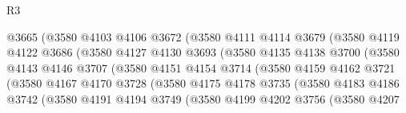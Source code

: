 \begin{lexlean}{R3}
\begin{coremodule}
                            @3665
                            (@3580
                              @4103
                              @4106
                              @3672
                              (@3580
                                @4111
                                @4114
                                @3679
                                (@3580
                                  @4119
                                  @4122
                                  @3686
                                  (@3580
                                    @4127
                                    @4130
                                    @3693
                                    (@3580
                                      @4135
                                      @4138
                                      @3700
                                      (@3580
                                        @4143
                                        @4146
                                        @3707
                                        (@3580
                                          @4151
                                          @4154
                                          @3714
                                          (@3580
                                            @4159
                                            @4162
                                            @3721
                                            (@3580
                                              @4167
                                              @4170
                                              @3728
                                              (@3580
                                                @4175
                                                @4178
                                                @3735
                                                (@3580
                                                  @4183
                                                  @4186
                                                  @3742
                                                  (@3580
                                                    @4191
                                                    @4194
                                                    @3749
                                                    (@3580
                                                      @4199
                                                      @4202
                                                      @3756
                                                      (@3580
                                                        @4207

\end{coremodule}
\end{lexlean}
